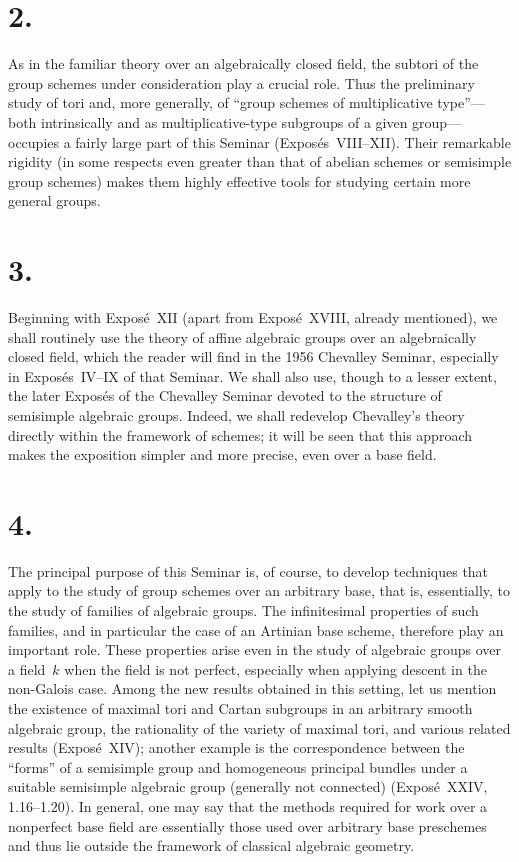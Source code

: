 \section*{2.}

As in the familiar theory over an algebraically closed field, the subtori of the
group schemes under consideration play a crucial role.  Thus the preliminary study
of tori and, more generally, of ``group schemes of multiplicative type''---both
intrinsically and as multiplicative-type subgroups of a given group---occupies a
fairly large part of this Seminar (Expos\'es~VIII--XII).  Their remarkable rigidity
(in some respects even greater than that of abelian schemes or semisimple group
schemes) makes them highly effective tools for studying certain more general groups.

\section*{3.}

Beginning with Expos\'e~XII (apart from Expos\'e~XVIII, already mentioned), we shall
routinely use the theory of affine algebraic groups over an algebraically closed
field, which the reader will find in the 1956 Chevalley Seminar, especially in
Expos\'es~IV--IX of that Seminar.  We shall also use, though to a lesser extent, the
later Expos\'es of the Chevalley Seminar devoted to the structure of semisimple
algebraic groups.  Indeed, we shall redevelop Chevalley's theory directly within the
framework of schemes; it will be seen that this approach makes the exposition
simpler and more precise, even over a base field.

\section*{4.}

The principal purpose of this Seminar is, of course, to develop techniques that
apply to the study of group schemes over an arbitrary base, that is, essentially,
to the study of families of algebraic groups.  The infinitesimal properties of such
families, and in particular the case of an Artinian base scheme, therefore play an
important role.  These properties arise even in the study of algebraic groups over
a field~$k$ when the field is not perfect, especially when applying descent in the
non-Galois case.  Among the new results obtained in this setting, let us mention the
existence of maximal tori and Cartan subgroups in an arbitrary smooth algebraic
group, the rationality of the variety of maximal tori, and various related results
(Expos\'e~XIV); another example is the correspondence between the ``forms''
of a semisimple group and homogeneous principal bundles under a suitable semisimple
algebraic group (generally not connected) (Expos\'e~XXIV, 1.16--1.20).  In general,
one may say that the methods required for work over a nonperfect base field are
essentially those used over arbitrary base preschemes and thus lie outside the
framework of classical algebraic geometry.

